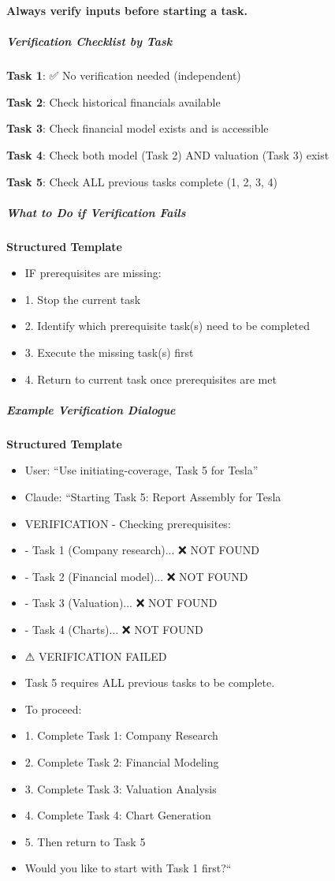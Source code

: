 \documentclass[11pt]{article}
\begin{document}
\textbf{Always verify inputs before starting a task.}


\subparagraph{Verification Checklist by Task}\mbox{}\par

\textbf{Task 1}: ✅ No verification needed (independent)


\textbf{Task 2}: Check historical financials available


\textbf{Task 3}: Check financial model exists and is accessible


\textbf{Task 4}: Check both model (Task 2) AND valuation (Task 3) exist


\textbf{Task 5}: Check ALL previous tasks complete (1, 2, 3, 4)


\subparagraph{What to Do if Verification Fails}\mbox{}\par

\textbf{Structured Template}
\begin{itemize}[leftmargin=*,itemsep=2pt,topsep=2pt]
\item {} IF prerequisites are missing:
\item {} 1. Stop the current task
\item {} 2. Identify which prerequisite task(s) need to be completed
\item {} 3. Execute the missing task(s) first
\item {} 4. Return to current task once prerequisites are met
\end{itemize}

\subparagraph{Example Verification Dialogue}\mbox{}\par

\textbf{Structured Template}
\begin{itemize}[leftmargin=*,itemsep=2pt,topsep=2pt]
\item {} User: ``Use initiating-coverage, Task 5 for Tesla''
\item {} Claude: ``Starting Task 5: Report Assembly for Tesla
\item {} VERIFICATION - Checking prerequisites:
\item {} - Task 1 (Company research)... ❌ NOT FOUND
\item {} - Task 2 (Financial model)... ❌ NOT FOUND
\item {} - Task 3 (Valuation)... ❌ NOT FOUND
\item {} - Task 4 (Charts)... ❌ NOT FOUND
\item {} ⚠ VERIFICATION FAILED
\item {} Task 5 requires ALL previous tasks to be complete.
\item {} To proceed:
\item {} 1. Complete Task 1: Company Research
\item {} 2. Complete Task 2: Financial Modeling
\item {} 3. Complete Task 3: Valuation Analysis
\item {} 4. Complete Task 4: Chart Generation
\item {} 5. Then return to Task 5
\item {} Would you like to start with Task 1 first?``
\end{itemize}
\end{document}
